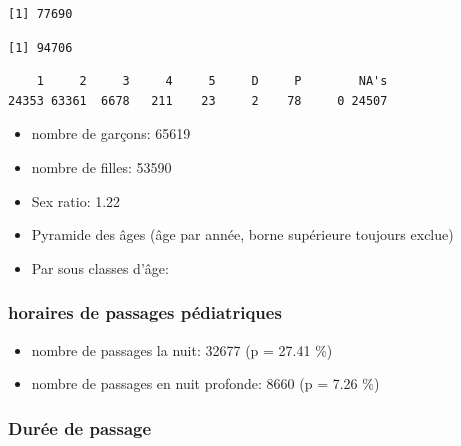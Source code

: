 \documentclass[]{article}
\begin{document}
\begin{verbatim}
[1] 77690
\end{verbatim}

\begin{verbatim}
[1] 94706
\end{verbatim}

\begin{verbatim}
    1     2     3     4     5     D     P        NA's 
24353 63361  6678   211    23     2    78     0 24507 
\end{verbatim}

\begin{itemize}
\itemsep1pt\parskip0pt
\item
  nombre de garçons: 65619
\item
  nombre de filles: 53590
\item
  Sex ratio: 1.22
\item
  Pyramide des âges (âge par année, borne supérieure toujours exclue)
\item
  Par sous classes d'âge:
\end{itemize}

\subsubsection{horaires de passages
pédiatriques}\label{horaires-de-passages-pediatriques}

\begin{itemize}
\itemsep1pt\parskip0pt
\item
  nombre de passages la nuit: 32677 (p = 27.41 \%)
\item
  nombre de passages en nuit profonde: 8660 (p = 7.26 \%)
\end{itemize}

\subsubsection{Durée de passage}\label{duree-de-passage}
\end{document}
